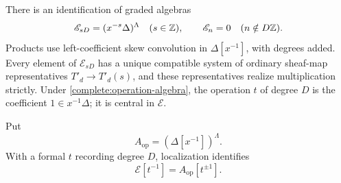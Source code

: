 \begin{proposition}
\label{complete:operations}
There is an identification of graded algebras
\begin{equation}
\label{complete:operation-algebra}
 \mathscr E_{sD}=(x^{-s}\Delta)^\Lambda\quad(s\in\mathbb Z),
 \qquad
 \mathscr E_n=0\quad(n\notin D\mathbb Z).
\end{equation}
Products use left-coefficient skew convolution in $\Delta[x^{-1}]$,
with degrees added. Every element of $\mathscr E_{sD}$ has a unique
compatible system of
ordinary sheaf-map representatives
$T'_d\to T'_d(s)$, and these representatives realize multiplication
strictly. Under \eqref{complete:operation-algebra}, the operation $t$
of degree $D$ is the coefficient $1\in x^{-1}\Delta$; it is central
in $\mathscr E$.

Put
\[
 A_{\mathrm{op}}=(\Delta[x^{-1}])^\Lambda.
\]
With a formal $t$ recording degree $D$, localization identifies
\begin{equation}
\label{complete:localized-operations}
 \mathscr E[t^{-1}]=A_{\mathrm{op}}[t^{\pm1}].
\end{equation}
\end{proposition}

